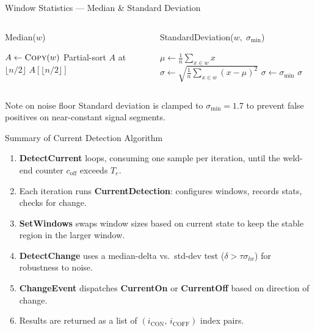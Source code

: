 \documentclass{beamer}
\begin{document}
\begin{frame}{Window Statistics --- Median \& Standard Deviation}
  \begin{columns}[T]
      \begin{block}{Median($w$)}
        \begin{algorithmic}[1]
            \State $A \gets \textsc{Copy}(w)$
            \State Partial-sort $A$ at $\lfloor n/2 \rfloor$
            \State \Return $A[\lfloor n/2 \rfloor]$
          \EndFunction
        \end{algorithmic}
      \end{block}

      \begin{block}{StandardDeviation($w,\; \sigma_\text{min}$)}
        \begin{algorithmic}[1]
            \State $\mu \gets \frac{1}{n}\sum_{x \in w} x$
            \State $\sigma \gets \sqrt{\frac{1}{n}\sum_{x \in w}(x-\mu)^2}$
              \State $\sigma \gets \sigma_\text{min}$
            \EndIf
            \State \Return $\sigma$
          \EndFunction
        \end{algorithmic}
      \end{block}
  \end{columns}
  \vspace{0.5em}
  \begin{block}{Note on noise floor}
    Standard deviation is clamped to $\sigma_\text{min} = 1.7$ to
    prevent false positives on near-constant signal segments.
  \end{block}
\end{frame}

\begin{frame}{Summary of Current Detection Algorithm}
  \begin{enumerate}
    \item \textbf{DetectCurrent} loops, consuming one sample per iteration,
          until the weld-end counter $c_\text{off}$ exceeds $T_e$.
    \item Each iteration runs \textbf{CurrentDetection}:
          configures windows, records stats, checks for change.
    \item \textbf{SetWindows} swaps window sizes based on current state
          to keep the stable region in the larger window.
    \item \textbf{DetectChange} uses a median-delta vs.\ std-dev test
          ($\delta > \tau\sigma_{lw}$) for robustness to noise.
    \item \textbf{ChangeEvent} dispatches \textbf{CurrentOn} or
          \textbf{CurrentOff} based on direction of change.
    \item Results are returned as a list of
          $(i_\text{CON},\,i_\text{COFF})$ index pairs.
  \end{enumerate}
\end{frame}
\end{document}
